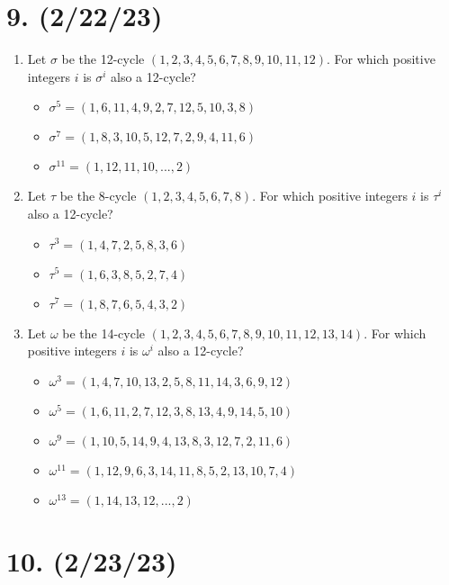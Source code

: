 \documentclass{article}
\begin{document}
\section*{9. (2/22/23)}

\begin{enumerate}[label=(\alph*)]
    \item Let $\sigma$ be the 12-cycle $(1, 2, 3, 4, 5, 6, 7, 8, 9, 10, 11, 12)$. For which positive integers $i$ is $\sigma^i$ also a 12-cycle?
        \begin{itemize}[itemsep=0em]
            \item $\sigma^5 = (1, 6, 11, 4, 9, 2, 7, 12, 5, 10, 3, 8)$
            \item $\sigma^7 = (1, 8, 3, 10, 5, 12, 7, 2, 9, 4, 11, 6)$
            \item $\sigma^11 = (1, 12, 11, 10, ..., 2)$
        \end{itemize}
    \item Let $\tau$ be the 8-cycle $(1, 2, 3, 4, 5, 6, 7, 8)$. For which positive integers $i$ is $\tau^i$ also a 12-cycle?
        \begin{itemize}[itemsep=0em]
            \item $\tau^3 = (1, 4, 7, 2, 5, 8, 3, 6)$
            \item $\tau^5 = (1, 6, 3, 8, 5, 2, 7, 4)$
            \item $\tau^7 = (1, 8, 7, 6, 5, 4, 3, 2)$
        \end{itemize}
    \item Let $\omega$ be the 14-cycle $(1, 2, 3, 4, 5, 6, 7, 8, 9, 10, 11, 12, 13, 14)$. For which positive integers $i$ is $\omega^i$ also a 12-cycle?
        \begin{itemize}[itemsep=0em]
            \item $\omega^3 = (1, 4, 7, 10, 13, 2, 5, 8, 11, 14, 3, 6, 9, 12)$
            \item $\omega^5 = (1, 6, 11, 2, 7, 12, 3, 8, 13, 4, 9, 14, 5, 10)$
            \item $\omega^9 = (1, 10, 5, 14, 9, 4, 13, 8, 3, 12, 7, 2, 11, 6)$
            \item $\omega^{11} = (1, 12, 9, 6, 3, 14, 11, 8, 5, 2, 13, 10, 7, 4)$
            \item $\omega^{13} = (1, 14, 13, 12, ..., 2)$
        \end{itemize}
\end{enumerate}

\section*{10. (2/23/23)}
\end{document}
